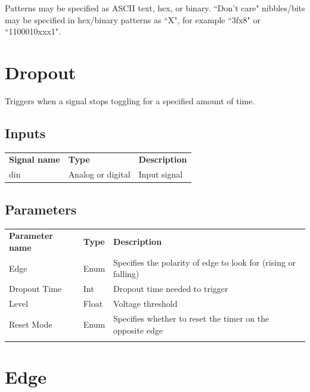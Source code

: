 Patterns may be specified as ASCII text, hex, or binary. ``Don't care" nibbles/bits may be specified in hex/binary
patterns as ``X", for example ``3fx8" or ``1100010xxx1".

\pagebreak

\section{Dropout}

Triggers when a signal stops toggling for a specified amount of time.

\subsection{Inputs}

\begin{tabularx}{16cm}{llX}
\thickhline
\textbf{Signal name} & \textbf{Type} & \textbf{Description} \\
\thickhline
din & Analog or digital & Input signal \\
\end{tabularx}

\subsection{Parameters}

\begin{tabularx}{16cm}{llX}
\thickhline
\textbf{Parameter name} & \textbf{Type} & \textbf{Description} \\
\thickhline
Edge & Enum & Specifies the polarity of edge to look for (rising or falling) \\
\thickhline
Dropout Time & Int & Dropout time needed to trigger \\
\thickhline
Level & Float & Voltage threshold\\
\thickhline
Reset Mode & Enum & Specifies whether to reset the timer on the opposite edge \\
\thickhline
\end{tabularx}

\section{Edge}

